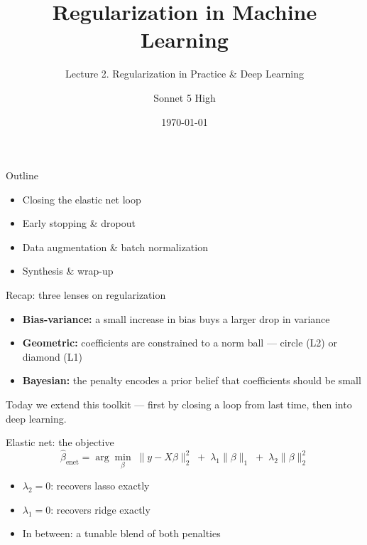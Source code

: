 \documentclass[aspectratio=169, 10pt]{beamer}
\title{Regularization in Machine Learning}
\subtitle{Lecture 2. Regularization in Practice \& Deep Learning}
\author{Sonnet 5 High}
\institute{Claude Cowork}
\date{\today}
\begin{document}
\begin{frame}
  \titlepage
\end{frame}

\begin{frame}{Outline}
  \begin{itemize}
    \item Closing the elastic net loop
    \item Early stopping \& dropout
    \item Data augmentation \& batch normalization
    \item Synthesis \& wrap-up
  \end{itemize}
\end{frame}

\begin{frame}{Recap: three lenses on regularization}
  \begin{itemize}
    \item \textbf{Bias-variance:} a small increase in bias buys a larger drop in variance
    \item \textbf{Geometric:} coefficients are constrained to a norm ball --- circle (L2) or diamond (L1)
    \item \textbf{Bayesian:} the penalty encodes a prior belief that coefficients should be small
  \end{itemize}
  Today we extend this toolkit --- first by closing a loop from last time, then into deep learning.
\end{frame}

\begin{frame}{Elastic net: the objective}
  \[
    \hat\beta_{\text{enet}} = \arg\min_\beta \; \|y - X\beta\|_2^2 \;+\; \lambda_1 \|\beta\|_1 \;+\; \lambda_2 \|\beta\|_2^2
  \]
  \begin{itemize}
    \item $\lambda_2 = 0$: recovers lasso exactly
    \item $\lambda_1 = 0$: recovers ridge exactly
    \item In between: a tunable blend of both penalties
  \end{itemize}
\end{frame}
\end{document}
